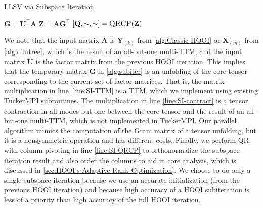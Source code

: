     \begin{algorithm}
        \caption{LLSV via Subspace Iteration}
        \label{alg:subiter}
        \begin{algorithmic}[1]
                \State $\mathbf{G} = \mathbf{U}^\intercal \mathbf{A} $ \label{line:SI-TTM}
                \State $\mathbf{Z} = \mathbf{A} \mathbf{G}^\intercal$ \label{line:SI-contract}
                \State $[\mathbf{Q}, \sim, \sim] = \Call{QRCP}{\mathbf{Z}}$ \label{line:SI-QRCP}
        \EndFunction
        \end{algorithmic}
    \end{algorithm}

    We note that the input matrix $\mathbf{A}$ is $\mathbf{Y}_{(k)}$ from
    \cref{alg:Classic-HOOI} or $\mathbf{X}_{(m)}$ from \cref{alg:dimtree},
    which is the result of an all-but-one multi-TTM, and the input matrix
    $\mathbf{U}$ is the factor matrix from the previous HOOI iteration. This implies
    that the temporary matrix $\mathbf{G}$ in \cref{alg:subiter} is an unfolding of
    the core tensor corresponding to the current set of factor matrices. That
    is, the matrix multiplication in line \ref{line:SI-TTM} is a TTM, which we
    implement using existing TuckerMPI subroutines. The multiplication in
    line \ref{line:SI-contract} is a tensor contraction in all modes but one between
    the core tensor and the result of an all-but-one multi-TTM, which is not
    implemented in TuckerMPI. Our parallel algorithm mimics the computation of
    the Gram matrix of a tensor unfolding, but it is a nonsymmetric operation
    and has different costs. Finally, we perform QR with column pivoting in
    line \ref{line:SI-QRCP} to orthonormalize the subspace iteration result and also
    order the columns to aid in core analysis, which is discussed in
    \cref{sec:HOOI's Adaptive Rank Optimization}. We choose to do only a single subspace iteration
    because we use an accurate initialization (from the previous HOOI iteration)
    and because high accuracy of a HOOI subiteration is less of a priority than
    high accuracy of the full HOOI iteration.

